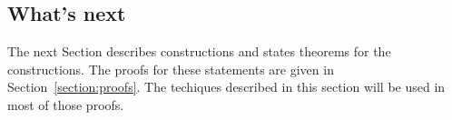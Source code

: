 \subsection*{What's next}
The next Section describes constructions and states theorems for the constructions. The proofs for these statements are given
in Section~\ref{section:proofs}. The techiques described in this section will be used in most of those proofs.